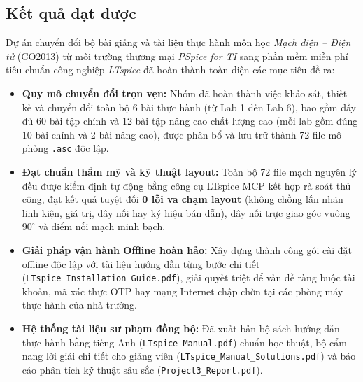 \documentclass[12pt,a4paper]{article}
\begin{document}
\subsection{Kết quả đạt được}
Dự án chuyển đổi bộ bài giảng và tài liệu thực hành môn học \textit{Mạch điện -- Điện tử} (CO2013) từ môi trường thương mại \textit{PSpice for TI} sang phần mềm miễn phí tiêu chuẩn công nghiệp \textit{LTspice} đã hoàn thành toàn diện các mục tiêu đề ra:
\begin{itemize}[itemsep=2pt]
  \item \textbf{Quy mô chuyển đổi trọn vẹn:} Nhóm đã hoàn thành việc khảo sát, thiết kế và chuyển đổi toàn bộ 6 bài thực hành (từ Lab 1 đến Lab 6), bao gồm đầy đủ 60 bài tập chính và 12 bài tập nâng cao chất lượng cao (mỗi lab gồm đúng 10 bài chính và 2 bài nâng cao), được phân bổ và lưu trữ thành 72 file mô phỏng \texttt{.asc} độc lập.
  \item \textbf{Đạt chuẩn thẩm mỹ và kỹ thuật layout:} Toàn bộ 72 file mạch nguyên lý đều được kiểm định tự động bằng công cụ LTspice MCP kết hợp rà soát thủ công, đạt kết quả tuyệt đối \textbf{0 lỗi va chạm layout} (không chồng lấn nhãn linh kiện, giá trị, dây nối hay ký hiệu bán dẫn), dây nối trực giao góc vuông $90^\circ$ và điểm nối mạch minh bạch.
  \item \textbf{Giải pháp vận hành Offline hoàn hảo:} Xây dựng thành công gói cài đặt offline độc lập với tài liệu hướng dẫn từng bước chi tiết (\texttt{LTspice\_}\allowbreak\texttt{Installation\_}\allowbreak\texttt{Guide.pdf}), giải quyết triệt để vấn đề ràng buộc tài khoản, mã xác thực OTP hay mạng Internet chập chờn tại các phòng máy thực hành của nhà trường.
  \item \textbf{Hệ thống tài liệu sư phạm đồng bộ:} Đã xuất bản bộ sách hướng dẫn thực hành bằng tiếng Anh (\texttt{LTspice\_Manual.pdf}) chuẩn học thuật, bộ cẩm nang lời giải chi tiết cho giảng viên (\texttt{LTspice\_Manual\_Solutions.pdf}) và báo cáo phân tích kỹ thuật sâu sắc (\texttt{Project3\_Report.pdf}).
\end{itemize}
\end{document}

